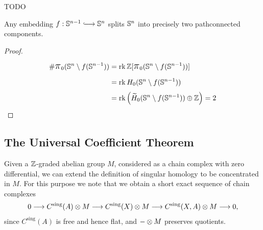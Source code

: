 	\begin{corollary}
		TODO
	\end{corollary}

	\begin{corollary}
		Any embedding $f:\S^{n-1} \longrightincl \S^n$ splits $\S^n$ into precisely two pathconnected components.
	\end{corollary}
	\begin{proof}
		\begin{align*}
			\# \largepi_0(\S^n \setminus f(\S^{n-1})) &= \rk \Z[\largepi_0(\S^n \setminus f(\S^{n-1}))]\\
			&= \rk H_0(\S^n \setminus f(\S^{n-1}))\\
			&= \rk \left (\widetilde{H}_0(\S^n \setminus f(\S^{n-1})) \oplus \Z\right) = 2
		\end{align*}
	\end{proof}


	\newpage
	\subsection{The Universal Coefficient Theorem}

	Given a $\Z$-graded abelian group $M$, considered as a chain complex with zero differential, we can extend the definition of singular homology to be concentrated in $M$. For this purpose we note that we obtain a short exact sequence of chain complexes
	\begin{align*}
		0 --> C^\text{sing}(A) \tensor M --> C^\text{sing}(X) \tensor M --> C^\text{sing}(X,A) \tensor M --> 0,
	\end{align*}
	since $C^\text{sing}(A)$ is free and hence flat, and $- \tensor M$ preserves quotients.

